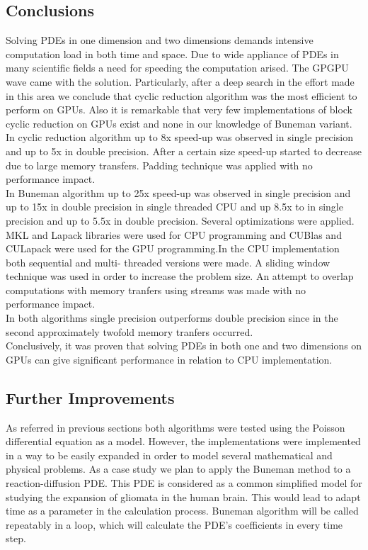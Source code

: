 \subsection{Conclusions}
Solving PDEs in one dimension and two dimensions demands intensive computation load in both time and space.
Due to wide appliance of PDEs in many scientific fields a need for speeding the computation arised. The GPGPU
wave came with the solution.
Particularly, after a deep search in the effort made in this area we conclude that cyclic reduction algorithm 
was the most efficient to perform on GPUs. Also it is remarkable that very few implementations of block cyclic reduction on GPUs  exist and none in our knowledge of Buneman variant.\\
In cyclic reduction algorithm up to 8x speed-up was observed in single precision and up to 5x in double precision.
After a certain size speed-up started to decrease due to large memory transfers. Padding technique was applied with
no performance impact.\\
In Buneman algorithm up to 25x speed-up was observed in single precision and up to 15x in double precision in single
threaded CPU and up 8.5x to in single precision and up to 5.5x in double precision. Several optimizations were applied. MKL and Lapack libraries were used for CPU programming and CUBlas and CULapack were used for the GPU programming.In the CPU implementation both sequential and multi- threaded versions were made. A sliding window technique was used in order to increase the problem size. An attempt to overlap computations with memory tranfers using streams was made with no performance impact.\\
In both algorithms single precision outperforms double precision since in the second approximately twofold memory 
tranfers occurred.\\
Conclusively, it was proven that solving PDEs in both one and two dimensions on GPUs can give significant performance
in relation to CPU implementation. 
\subsection{Further Improvements}
As referred in previous sections both algorithms were tested using the Poisson differential equation 
as a model. However, the implementations were implemented in a way to be easily expanded in order to model 
several mathematical and physical problems.  
As a case study we plan to apply the Buneman method to a reaction-diffusion PDE.  This PDE is considered as a common simplified model for studying the expansion of gliomata in the human brain. This would lead to adapt time as a parameter in the calculation process. Buneman algorithm will be called repeatably in a loop, which will calculate the
PDE's coefficients in every time step.
